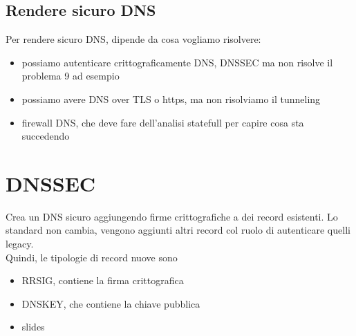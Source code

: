 \documentclass[12pt, oneside]{extbook} %
\begin{document}
\subsection{Rendere sicuro DNS}
Per rendere sicuro DNS, dipende da cosa vogliamo risolvere:
\begin{itemize}
	\item possiamo autenticare crittograficamente DNS, DNSSEC ma non risolve il problema 9 ad esempio
	\item possiamo avere DNS over TLS o https, ma non risolviamo il tunneling
	\item firewall DNS, che deve fare dell'analisi statefull per capire cosa sta succedendo
\end{itemize}
\section{DNSSEC}
Crea un DNS sicuro aggiungendo firme crittografiche a dei record esistenti. Lo standard non cambia, vengono aggiunti altri record col ruolo di autenticare quelli legacy.\\Quindi, le tipologie di record nuove sono
\begin{itemize}
	\item RRSIG, contiene la firma crittografica
	\item DNSKEY, che contiene la chiave pubblica 
	\item slides
\end{itemize}
\end{document}
